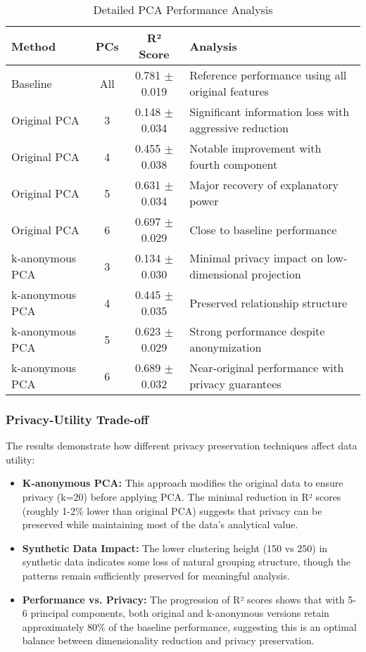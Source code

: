 \documentclass[a4paper, 11pt]{article}
\begin{document}
\begin{table}[h]
\centering
\begin{tabular}{|l|c|c|p{5cm}|}
\hline
\textbf{Method} & \textbf{PCs} & \textbf{R² Score} & \textbf{Analysis} \\
\hline
Baseline & All & 0.781 $\pm$ 0.019 & Reference performance using all original features \\
\hline
Original PCA & 3 & 0.148 $\pm$ 0.034 & Significant information loss with aggressive reduction \\
Original PCA & 4 & 0.455 $\pm$ 0.038 & Notable improvement with fourth component \\
Original PCA & 5 & 0.631 $\pm$ 0.034 & Major recovery of explanatory power \\
Original PCA & 6 & 0.697 $\pm$ 0.029 & Close to baseline performance \\
\hline
k-anonymous PCA & 3 & 0.134 $\pm$ 0.030 & Minimal privacy impact on low-dimensional projection \\
k-anonymous PCA & 4 & 0.445 $\pm$ 0.035 & Preserved relationship structure \\
k-anonymous PCA & 5 & 0.623 $\pm$ 0.029 & Strong performance despite anonymization \\
k-anonymous PCA & 6 & 0.689 $\pm$ 0.032 & Near-original performance with privacy guarantees \\
\hline
\end{tabular}
\caption{Detailed PCA Performance Analysis}
\label{tab:pca_detailed}
\end{table}

\subsubsection{Privacy-Utility Trade-off}
The results demonstrate how different privacy preservation techniques affect data utility:

\begin{itemize}
    \item \textbf{K-anonymous PCA:} This approach modifies the original data to ensure privacy (k=20) before applying PCA. The minimal reduction in R² scores (roughly 1-2\% lower than original PCA) suggests that privacy can be preserved while maintaining most of the data's analytical value.
    
    \item \textbf{Synthetic Data Impact:} The lower clustering height (150 vs 250) in synthetic data indicates some loss of natural grouping structure, though the patterns remain sufficiently preserved for meaningful analysis.
    
    \item \textbf{Performance vs. Privacy:} The progression of R² scores shows that with 5-6 principal components, both original and k-anonymous versions retain approximately 80\% of the baseline performance, suggesting this is an optimal balance between dimensionality reduction and privacy preservation.
\end{itemize}
\end{document}
